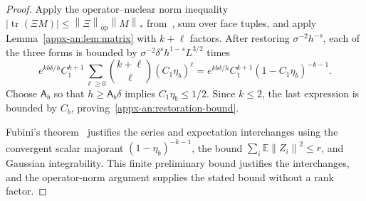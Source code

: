 \documentclass[11pt,letterpaper]{article}
\theoremstyle{remark}
\newcommand{\E}{\mathbb E}
\newcommand{\tr}{\operatorname{tr}}
\newcommand{\op}{\mathrm{op}}
\newcommand{\norm}[1]{\left\lVert#1\right\rVert}
\begin{document}
\begin{proof}
Apply the operator--nuclear norm inequality
\(|\tr(\Xi M)|\le\norm\Xi_\op\norm M_*\)
from~\cite[Chapter~IV]{Bhatia1997}, sum over face
tuples, and apply Lemma~\ref{appx-an:lem:matrix} with \(k+\ell\) factors.
After restoring \(\sigma^{-2}h^{-s}\), each of the three forms
is bounded by \(\sigma^{-2}\delta^sh^{1-s}L^{3/2}\) times
\[
 e^{kb\delta/h}C_1^{k+1}
 \sum_{\ell\ge0}\binom{k+\ell}{\ell}(C_1\eta_b)^\ell
 =e^{kb\delta/h}C_1^{k+1}(1-C_1\eta_b)^{-k-1}.
\]
Choose \(\mathsf A_b\) so that \(h\ge\mathsf A_b\delta\) implies
\(C_1\eta_b\le1/2\). Since \(k\le2\), the last expression is
bounded by \(C_b\), proving~\eqref{appx-an:restoration-bound}.

Fubini's theorem~\cite[Section~2.5]{Folland1999} justifies the
series and expectation interchanges using the convergent scalar
majorant \((1-\eta_b)^{-k-1}\), the bound
\(\sum_i\E\norm{Z_i}^2\le r\), and Gaussian integrability.
This finite preliminary bound justifies the interchanges, and the
operator-norm argument supplies the stated bound without a rank factor.
\end{proof}
\end{document}
